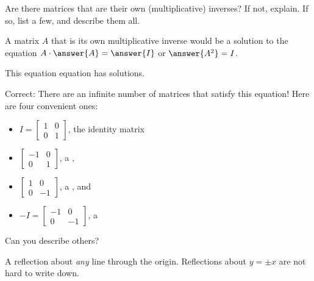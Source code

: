 \documentclass[space,nooutcomes]{ximera}
\begin{document}
\begin{question}
Are there matrices that are their own (multiplicative) inverses?  If not, explain.  If so, list a few, and describe them all.
\begin{solution}
A matrix $A$ that is its own multiplicative inverse would be a solution to the equation $A\cdot \answer{A}=\answer{I}$ or $\answer{A^2}=I$.  

This equation equation has  solutions.   
\begin{question}
Correct:  There are an infinite number of matrices that satisfy this equation!
Here are four convenient ones: 
\begin{itemize}
\item $I=\begin{bmatrix} 1&0 \\ 0&1 \end{bmatrix}$, the identity matrix
\item $\begin{bmatrix} -1&0 \\ 0&1 \end{bmatrix}$, a , 
\item $\begin{bmatrix} 1&0 \\ 0&-1 \end{bmatrix}$, a , and 
\item $-I = \begin{bmatrix} -1&0 \\ 0&-1 \end{bmatrix}$, a 
\end{itemize}
\begin{question}
Can you describe others?  
\begin{freeResponse}
\begin{hint}
A reflection about \emph{any} line through the origin.  Reflections about $y=\pm x$ are not hard to write down. 
\end{hint}
\end{freeResponse}
\end{question}
\end{question}
\end{solution}
\end{question}
\end{document}

